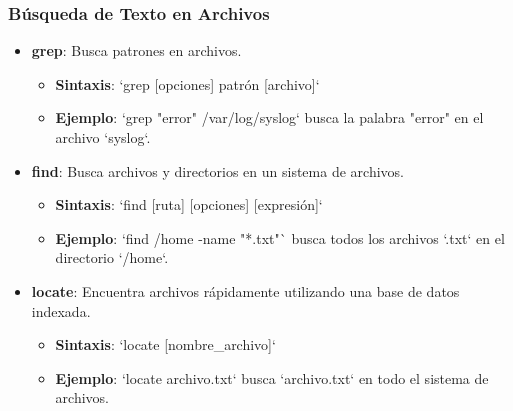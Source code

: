\documentclass{beamer}
\begin{document}
\begin{frame}
\frametitle{Búsqueda de Texto en Archivos}
\begin{itemize}
    \item \textbf{grep}: Busca patrones en archivos.
    \begin{itemize}
        \item \textbf{Sintaxis}: `grep [opciones] patrón [archivo]`
        \item \textbf{Ejemplo}: `grep "error" /var/log/syslog` busca la palabra "error" en el archivo `syslog`.
    \end{itemize}
    \item \textbf{find}: Busca archivos y directorios en un sistema de archivos.
    \begin{itemize}
        \item \textbf{Sintaxis}: `find [ruta] [opciones] [expresión]`
        \item \textbf{Ejemplo}: `find /home -name "*.txt"` busca todos los archivos `.txt` en el directorio `/home`.
    \end{itemize}
    \item \textbf{locate}: Encuentra archivos rápidamente utilizando una base de datos indexada.
    \begin{itemize}
        \item \textbf{Sintaxis}: `locate [nombre_archivo]`
        \item \textbf{Ejemplo}: `locate archivo.txt` busca `archivo.txt` en todo el sistema de archivos.
    \end{itemize}
\end{itemize}
\end{frame}
\end{document}

